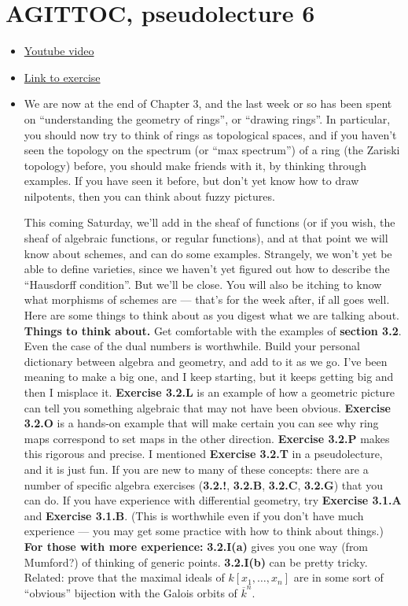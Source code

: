 \documentclass{book}
\theoremstyle{definition}
\begin{document}
\chapter{AGITTOC, pseudolecture 6}
\begin{itemize}
    \item \href{https://www.youtube.com/watch?v=zS3I4KKmtW0}{Youtube video}
    \item \href{https://math216.wordpress.com/2020/08/04/between-pseudolectures-6-and-7/}{Link to exercise}
    \item We are now at the end of Chapter 3, and the last week or so has been
    spent on ``understanding the geometry of rings'', or ``drawing rings''. In
    particular, you should now try to think of rings as topological spaces, and
    if you haven’t seen the topology on the spectrum (or ``max spectrum'') of a
    ring (the Zariski topology) before, you should make friends with it, by
    thinking through examples. If you have seen it before, but don’t yet know
    how to draw nilpotents, then you can think about fuzzy pictures.

    This coming Saturday, we’ll add in the sheaf of functions (or if you wish,
    the sheaf of algebraic functions, or regular functions), and at that point
    we will know about schemes, and can do some examples. Strangely, we won’t
    yet be able to define varieties, since we haven’t yet figured out how to
    describe the ``Hausdorff condition''. But we’ll be close.
    You will also be itching to know what morphisms of schemes are — that’s for the
    week after, if all goes well.
    Here are some things to think about as you digest what we are talking about.
    \textbf{Things to think about.}
    Get comfortable with the examples of \textbf{section 3.2}. Even the case of
    the dual numbers is worthwhile.
    Build your personal dictionary between algebra and geometry, and add to it as
    we go. I’ve been meaning to make a big one, and I keep starting, but it keeps
    getting big and then I misplace it.
    \textbf{Exercise 3.2.L} is an example of how a geometric picture can tell you
    something algebraic that may not have been obvious. 
    \textbf{Exercise 3.2.O} is a hands-on example that will make certain you
    can see why ring maps correspond to set maps in the other direction.
    \textbf{Exercise 3.2.P} makes this rigorous and precise.
    I mentioned \textbf{Exercise 3.2.T} in a pseudolecture, and it is just fun.
    If you are new to many of these concepts: there are a number of specific
    algebra exercises (\textbf{3.2.!}, \textbf{3.2.B}, \textbf{3.2.C},
    \textbf{3.2.G}) that you can do.
    If you have experience with differential geometry, try \textbf{Exercise 3.1.A}
    and \textbf{Exercise 3.1.B}. (This is worthwhile even if you don’t have much
    experience — you may get some practice with how to think about things.)
    \textbf{For those with more experience:}
    \textbf{3.2.I(a)} gives you one way (from Mumford?) of thinking of generic
    points. \textbf{3.2.I(b)} can be pretty tricky.
    Related: prove that the maximal ideals of $k[x_1, \dots, x_n]$ are in some
    sort of ``obvious'' bijection with the Galois orbits of $\overline{k}^n$.


\end{itemize}
\end{document}
